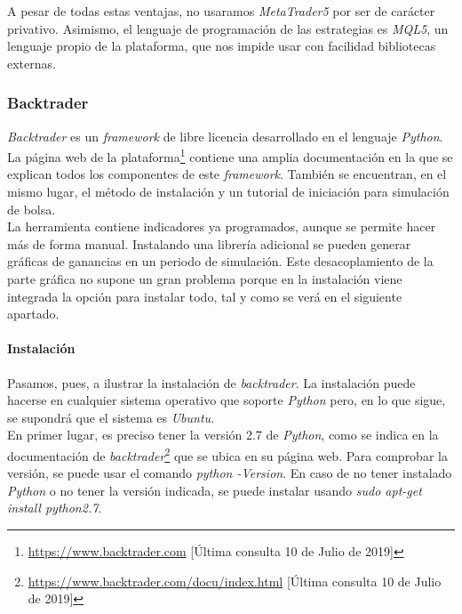 		A pesar de todas estas ventajas, no usaramos \textit{MetaTrader5} por ser de car\'acter privativo. Asimismo, el lenguaje de programaci\'on de las estrategias es \textit{MQL5}, un lenguaje propio de la plataforma, que nos impide usar con facilidad bibliotecas externas.\\
	
		\subsubsection{Backtrader}\label{sec:backtrader}
		
		\textit{Backtrader} es un \textit{framework} de libre licencia desarrollado en el lenguaje \textit{Python}. La p\'agina web de la plataforma\footnote{\url{https://www.backtrader.com} [\'Ultima consulta 10 de Julio de 2019]} contiene una amplia documentaci\'on en la que se explican todos los componentes de este \textit{framework}. Tambi\'en se encuentran, en el mismo lugar, el m\'etodo de instalaci\'on y un tutorial de iniciaci\'on para simulaci\'on de bolsa.\\
		
		La herramienta contiene indicadores ya programados, aunque se permite hacer m\'as de forma manual.  Instalando una librer\'ia adicional se pueden generar gr\'aficas de ganancias en un periodo de simulaci\'on. Este desacoplamiento de la parte gr\'afica no supone un gran problema porque en la instalaci\'on viene integrada la opci\'on para instalar todo, tal y como se ver\'a en el siguiente apartado.\\
		
		
		\paragraph{Instalaci\'on}\label{sec:install}
		
		Pasamos, pues, a ilustrar la instalaci\'on de \textit{backtrader}. La instalaci\'on puede hacerse en cualquier sistema operativo que soporte \textit{Python} pero, en lo que sigue, se supondr\'a que el sistema es \textit{Ubuntu}. \\
		
		En primer lugar, es preciso tener la versi\'on 2.7 de \textit{Python}, como se indica en la documentaci\'on de \textit{backtrader}\footnote{\url{https://www.backtrader.com/docu/index.html} [\'Ultima consulta 10 de Julio de 2019]} que se ubica en su p\'agina web. Para comprobar la versi\'on, se puede usar el comando \textit{python -Version}. En caso de no tener instalado \textit{Python} o no tener la versi\'on indicada, se puede instalar usando \textit{sudo apt-get install python2.7}.\\
		
